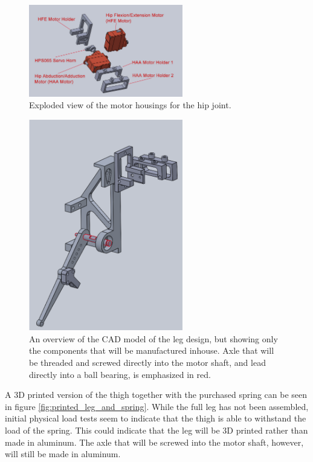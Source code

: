 \begin{figure}[h!]
    \centering
    \includegraphics[width=0.6\textwidth]{Images/exploded_motor_holder_hip.png}
    \caption{Exploded view of the motor housings for the hip joint.}
    \label{fig:exploded_motor_housing_hip}
\end{figure}

\begin{figure}[h!]
    \centering
    \includegraphics[width=0.6\textwidth]{Images/manufacture_only2.png}
    \caption{An overview of the CAD model of the leg design, but showing only the components that will be manufactured inhouse. Axle that will be threaded and screwed directly into the motor shaft, and lead directly into a ball bearing, is emphasized in red. }
    \label{fig:manufacture_only}
\end{figure}

A 3D printed version of the thigh together with the purchased spring can be seen in figure \ref{fig:printed_leg_and_spring}. While the full leg has not been assembled, initial physical load tests seem to indicate that the thigh is able to withstand the load of the spring. This could indicate that the leg will be 3D printed rather than made in aluminum. The axle that will be screwed into the motor shaft, however, will still be made in aluminum. 

